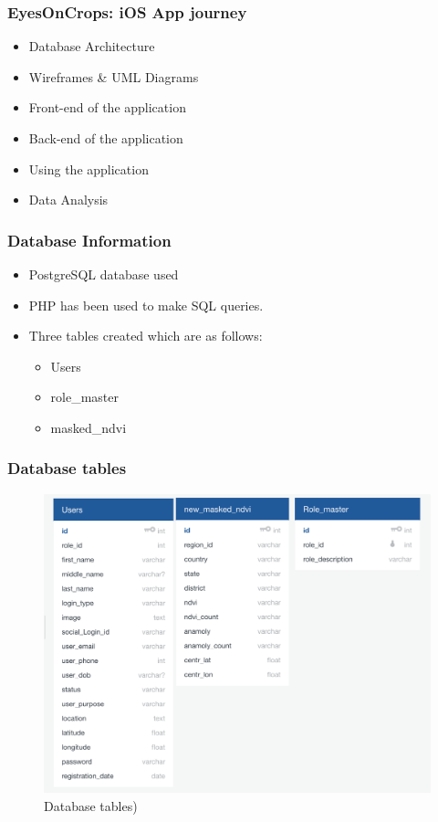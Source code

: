 \begin{frame}
\frametitle{EyesOnCrops: iOS App journey}
\begin{itemize}
    \item Database Architecture 
    \item Wireframes \& UML Diagrams
    \item Front-end of the application
    \item Back-end of the application
    \item Using the application
    \item Data Analysis
\end{itemize}
\end{frame}

\begin{frame}
\frametitle{Database Information}
\begin{itemize}
    \item PostgreSQL database used
    \item PHP has been used to make SQL queries.
    \item Three tables created which are as follows:
    
    \begin{itemize}
        \item Users
        \item role\_master
        \item masked\_ndvi
    \end{itemize}
    
\end{itemize}
\end{frame}

\begin{frame}
\frametitle{Database tables}
\begin{figure}
    \centering
    \begin{minipage}{0.75\columnwidth}
    \includegraphics[width=\linewidth]{final/figures/database_structure.png}
    \caption{\tiny{Database tables)}}
    \end{minipage}
\end{figure}
\end{frame}



